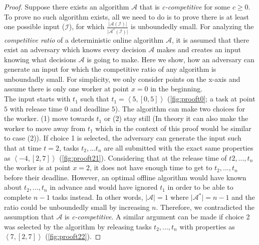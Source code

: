 \begin{proof}
Suppose there exists an algorithm $\mathcal{A}$ that is \textit{c-competitive} for some $c \geq 0$. To prove no such algorithm exists, all we need to do is to prove there is at least one possible input ($\mathcal{I}$), for which $\frac{\vert \mathcal{A}(\mathcal{I}) \vert}{\vert \mathcal{A}^{*}(\mathcal{I}) \vert}$ is unboundedly small. For analyzing the \textit{competitive ratio} of a deterministic online algorithm $\mathcal{A}$, it is assumed that there exist an adversary which knows every decision $\mathcal{A}$ makes and creates an input knowing what decisions $\mathcal{A}$ is going to make. Here we show, how an adversary can generate an input for which the competitive ratio of any algorithm is unboundadly small. For simplicity, we only consider points on the x-axis and assume there is only one worker at point $x=0$ in the beginning.\\

The input starts with $t_1$ such that $t_1 = \left\langle 5, \left[0, 5 \right] \right\rangle$ (\cref{fig:prooft0}; a task at point $5$ with release time $0$ and deadline $5$). The algorithm can make two choices for the worker. (1) move towards $t_1$ or (2) stay still (In theory it can also make the worker  to move away from $t_1$ which in the context of this proof would be similar to case (2)). If choice 1 is selected, the adversary can generate the input such that at time $t = 2$, tasks $t_2, ... t_n$ are all submitted with the exact same properties as $\left\langle -4, \left[2, 7 \right] \right\rangle$ (\cref{fig:prooft21}). Considering that at the release time of $t2, ..., t_n$ the worker is at point $x=2$, it does not have enough time to get to $t_2, ..., t_n$ before their deadline. However, an optimal offline algorithm would have known about $t_2, ..., t_n$ in advance and would have ignored $t_1$ in order to be able to complete $n-1$ tasks instead. In other words, $\vert \mathcal{A} \vert = 1$ where $\vert \mathcal{A}^{*} \vert = n - 1$ and the ratio could be unboundedly small by increasing $n$. Therefore, we contradicted the assumption that $\mathcal{A}$ is \textit{c-competitive}. A similar argument can be made if choice 2 was selected by the algorithm by releasing tasks $t_2, ...,t_n$ with properties as $\left\langle 7, \left[2, 7 \right] \right\rangle$ (\cref{fig:prooft22}).
\end{proof}

